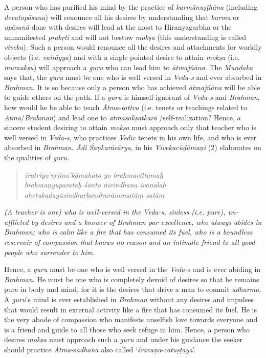 A person who has purified his mind by the practice of \emph{karmānuṣṭhāna} (including \emph{devatopāsana}) will renounce all his desires by understanding that \emph{karma} or \emph{upāsanā} done with desires will lead at the most to Hiranyagarbha or the unmanifested \emph{prakṛti} and will not bestow \emph{mokṣa} (this understanding is called \emph{viveka}). Such a person would renounce all the desires and attachments for worldly objects (i.e. \emph{vairāgya}) and with a single pointed desire to attain \emph{mokṣa} (i.e. \emph{mumukṣu}) will approach a \emph{guru} who can lead him to \emph{ātmajñāna}. The \emph{Muṇḍaka} says that, the \emph{guru} must be one who is well versed in \emph{Veda-s} and ever absorbed in \emph{Brahman}. It is so because only a person who has achieved \emph{ātmajñāna} will be able to guide others on the path. If a \emph{guru} is himself ignorant of \emph{Veda-s} and \emph{Brahman}, how would he be able to teach \emph{Ātma}-\emph{tattva} (i.e. tenets or teachings related to \emph{Ātma}/\emph{Brahman}) and lead one to \emph{ātmasākṣātkāra} /self-realization? Hence, a sincere student desiring to attain \emph{mokṣa} must approach only that teacher who is well versed in \emph{Veda-s}, who practices \emph{Vedic} tenets in his own life, and who is ever absorbed in \emph{Brahman}. \emph{Ādi} \emph{Śaṇkarācārya}, in his \emph{Vivekacūḍāmaṇi} (2) elaborates on the qualities of \emph{guru}.

\begin{verse}
\emph{śrotriyo'vṛjino'kāmahato yo brahmavittamaḥ }\\
\emph{brahmaṇyuparataḥ śānto nirindhana ivānalaḥ }\\
\emph{ahetukadayāsindhurbandhurānamatāṃ satām }
\end{verse}

\emph{(A teacher is one) who is well-versed in the Veda-s, sinless (i.e. pure), un-afflicted by desires and a knower of Brahman par excellence, who always abides in Brahman; who is calm like a fire that has consumed its fuel, who is a boundless reservoir of compassion that knows no reason and an intimate friend to all good people who surrender to him.}

Hence, a \emph{guru} must be one who is well versed in the \emph{Veda-s} and is ever abiding in \emph{Brahman}. He must be one who is completely devoid of desires so that he remains pure in body and mind, for it is the desires that drive a man to commit \emph{adharma}. A \emph{guru}'s mind is ever established in \emph{Brahman} without any desires and impulses that would result in external activity like a fire that has consumed its fuel. He is the very abode of compassion who manifests unselfish love towards everyone and is a friend and guide to all those who seek refuge in him. Hence, a person who desires \emph{mokṣa} must approach such a \emph{guru} and under his guidance the seeker should practice \emph{Ātma-}s\emph{ādhanā} also called `\emph{śravaṇa}-\emph{catuṣṭaya}'.

